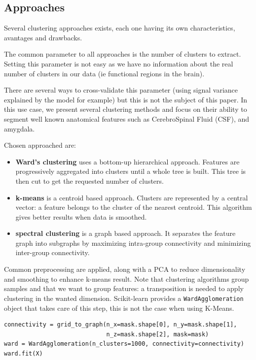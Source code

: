 \documentclass{frontiersSCNS} %
\newcounter{x}
\newcounter{y}
\newcounter{z}
\begin{document}
\subsection{Approaches}

Several clustering approaches exists, each one having its own characteristics,
avantages and drawbacks.

The common parameter to all approaches is the number of clusters to extract.
Setting this parameter is not easy as we have no information about the real
number of clusters in our data (ie functional regions in the brain).

There are several ways to cross-validate this parameter (using signal variance
explained by the model for example) but this is not the subject of this paper.
In this use case, we present several clustering methods and focus on their
ability to segment well known anatomical features such as CerebroSpinal Fluid
(CSF), and amygdala.

Chosen approached are:
\begin{itemize}
    \item{\bf Ward's clustering} uses a bottom-up hierarchical approach. Features are
        progressively aggregated into clusters until a whole tree is built. This
        tree is then cut to get the requested number of clusters.
    \item{\bf k-means} is a centroid based approach. Clusters are represented by
        a central vector: a feature belongs to the cluster of the nearest
        centroid. This algorithm gives better results when data is smoothed.
    \item{\bf spectral clustering} is a graph based approach. It separates
        the feature graph into subgraphs by maximizing intra-group connectivity and
        minimizing inter-group connectivity.
\end{itemize}

Common preprocessing are applied, along with a PCA to reduce dimensionality and
smoothing to enhance k-means result. Note that clustering algorithms group
samples and that we want to group features: a transposition is needed to apply
clustering in the wanted dimension. Scikit-learn provides a
\texttt{WardAgglomeration} object that takes care of this step, this is not the
case when using K-Means.

\begin{lstlisting}
connectivity = grid_to_graph(n_x=mask.shape[0], n_y=mask.shape[1],
                             n_z=mask.shape[2], mask=mask)
ward = WardAgglomeration(n_clusters=1000, connectivity=connectivity)
ward.fit(X)
\end{lstlisting}
\end{document}
